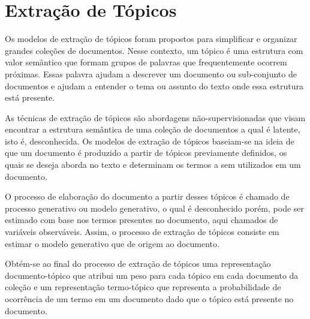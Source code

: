 \section{Extração de Tópicos}


Os modelos de extração de tópicos foram propostos para simplificar e organizar grandes coleções de documentos. Nesse contexto, um tópico é uma estrutura com valor semântico que formam grupos de palavras que frequentemente ocorrem próximas. Essas palavra ajudam a descrever um documento ou sub-conjunto de documentos e ajudam a entender o tema ou assunto do texto onde essa estrutura está presente.

As técnicas de extração de tópicos são abordagens não-supervisionadas que visam encontrar a estrutura semântica de uma coleção de documentos a qual é latente, isto é, desconhecida. Os modelos de extração de tópicos baseiam-se na ideia de que um documento é produzido a partir de tópicos previamente definidos, os quais se deseja aborda no texto e determinam os termos a sem utilizados em um documento.

O processo de elaboração do documento a partir desses tópicos é chamado de processo generativo ou modelo generativo, o qual é desconhecido porém, pode ser estimado  com base nos termos presentes no documento, aqui chamados de variáveis observáveis. Assim, o processo de extração de tópicos consiste em estimar o modelo generativo que de origem ao documento.

Obtém-se ao final do processo de extração de tópicos uma representação documento-tópico que atribui um peso para cada tópico em cada documento da coleção e um representação termo-tópico que representa a probabilidade de ocorrência de um termo em um documento dado que o tópico está presente no documento.






